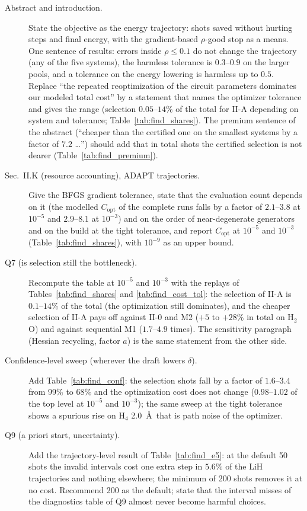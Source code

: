 \documentclass[11pt]{article}
\newcommand{\Copt}{C_{\mathrm{opt}}}
\begin{document}
\begin{description}
  \item[Abstract and introduction.] State the objective as the energy trajectory: shots saved without hurting steps and final energy, with the gradient-based $\rho$-good stop as a means. One sentence of results: errors inside $\rho\le0.1$ do not change the trajectory (any of the five systems), the harmless tolerance is $0.3$--$0.9$ on the larger pools, and a tolerance on the energy lowering is harmless up to $0.5$.
        Replace ``the repeated reoptimization of the circuit parameters dominates our modeled total cost'' by a statement that names the optimizer tolerance and gives the range (selection $0.05$--$14\%$ of the total for II-A depending on system and tolerance; Table~\ref{tab:find_shares}).
        The premium sentence of the abstract (``cheaper than the certified one on the smallest systems by a factor of $7.2$ \dots'') should add that in total shots the certified selection is not dearer (Table~\ref{tab:find_premium}).
  \item[Sec.~II.K (resource accounting), ADAPT trajectories.] Give the BFGS gradient tolerance, state that the evaluation count depends on it (the modelled $\Copt$ of the complete runs falls by a factor of $2.1$--$3.8$ at $10^{-5}$ and $2.9$--$8.1$ at $10^{-3}$) and on the order of near-degenerate generators and on the build at the tight tolerance, and report $\Copt$ at $10^{-5}$ and $10^{-3}$ (Table~\ref{tab:find_shares}), with $10^{-9}$ as an upper bound.
  \item[Q7 (is selection still the bottleneck).] Recompute the table at $10^{-5}$ and $10^{-3}$ with the replays of Tables~\ref{tab:find_shares} and \ref{tab:find_cost_tol}: the selection of II-A is $0.1$--$14\%$ of the total (the optimization still dominates), and the cheaper selection of II-A pays off against II-0 and M2 ($+5$ to $+28\%$ in total on H$_2$O) and against sequential M1 ($1.7$--$4.9$ times). The sensitivity paragraph (Hessian recycling, factor $a$) is the same statement from the other side.
  \item[Confidence-level sweep (wherever the draft lowers $\delta$).] Add Table~\ref{tab:find_conf}: the selection shots fall by a factor of $1.6$--$3.4$ from 99\% to 68\% and the optimization cost does not change ($0.98$--$1.02$ of the top level at $10^{-5}$ and $10^{-3}$); the same sweep at the tight tolerance shows a spurious rise on H$_4$ 2.0~\AA\ that is path noise of the optimizer.
  \item[Q9 (a priori start, uncertainty).] Add the trajectory-level result of Table~\ref{tab:find_e5}: at the default 50 shots the invalid intervals cost one extra step in $5.6\%$ of the LiH trajectories and nothing elsewhere; the minimum of 200 shots removes it at no cost. Recommend 200 as the default; state that the interval misses of the diagnostics table of Q9 almost never become harmful choices.

\end{description}
\end{document}
